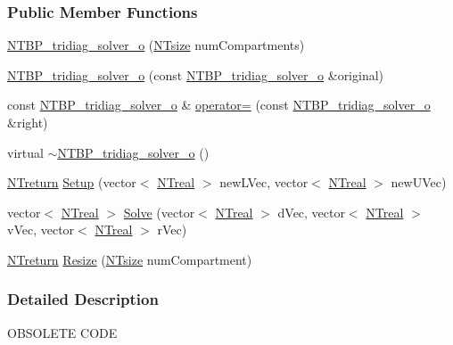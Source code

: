 \subsubsection*{Public Member Functions}
\begin{DoxyCompactItemize}
\item 
\hyperlink{class_n_t_b_p__tridiag__solver__o_a545d498899786953a316f7ffed8b1e03}{NTBP\_\-tridiag\_\-solver\_\-o} (\hyperlink{nt__types_8h_a06c124f2e4469769b58230253ce0560b}{NTsize} numCompartments)
\item 
\hyperlink{class_n_t_b_p__tridiag__solver__o_a9a253bd5568172dcff1d31040d12cbf9}{NTBP\_\-tridiag\_\-solver\_\-o} (const \hyperlink{class_n_t_b_p__tridiag__solver__o}{NTBP\_\-tridiag\_\-solver\_\-o} \&original)
\item 
const \hyperlink{class_n_t_b_p__tridiag__solver__o}{NTBP\_\-tridiag\_\-solver\_\-o} \& \hyperlink{class_n_t_b_p__tridiag__solver__o_ac5811e3278679f7c27400f222f4ccd17}{operator=} (const \hyperlink{class_n_t_b_p__tridiag__solver__o}{NTBP\_\-tridiag\_\-solver\_\-o} \&right)
\item 
virtual \hyperlink{class_n_t_b_p__tridiag__solver__o_a9fb9dabc30e4e8fc265cbc671f6f0af0}{$\sim$NTBP\_\-tridiag\_\-solver\_\-o} ()
\item 
\hyperlink{nt__types_8h_ab9564ee8f091e809d21b8451c6683c53}{NTreturn} \hyperlink{class_n_t_b_p__tridiag__solver__o_a0112f5be46dc22608ea3751787e84105}{Setup} (vector$<$ \hyperlink{nt__types_8h_a814a97893e9deb1eedcc7604529ba80d}{NTreal} $>$ newLVec, vector$<$ \hyperlink{nt__types_8h_a814a97893e9deb1eedcc7604529ba80d}{NTreal} $>$ newUVec)
\item 
vector$<$ \hyperlink{nt__types_8h_a814a97893e9deb1eedcc7604529ba80d}{NTreal} $>$ \hyperlink{class_n_t_b_p__tridiag__solver__o_aed8fb6abd3ce7ce14be35154114a92a7}{Solve} (vector$<$ \hyperlink{nt__types_8h_a814a97893e9deb1eedcc7604529ba80d}{NTreal} $>$ dVec, vector$<$ \hyperlink{nt__types_8h_a814a97893e9deb1eedcc7604529ba80d}{NTreal} $>$ vVec, vector$<$ \hyperlink{nt__types_8h_a814a97893e9deb1eedcc7604529ba80d}{NTreal} $>$ rVec)
\item 
\hyperlink{nt__types_8h_ab9564ee8f091e809d21b8451c6683c53}{NTreturn} \hyperlink{class_n_t_b_p__tridiag__solver__o_a83567610b81fc0201ac55bf94215a34d}{Resize} (\hyperlink{nt__types_8h_a06c124f2e4469769b58230253ce0560b}{NTsize} numCompartment)
\end{DoxyCompactItemize}


\subsubsection{Detailed Description}
OBSOLETE CODE

